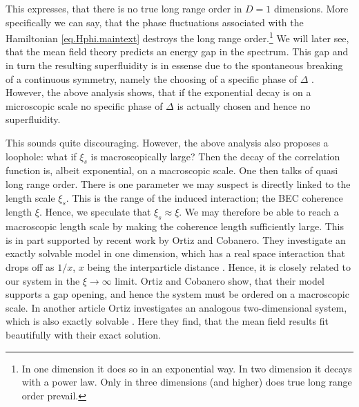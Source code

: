 This expresses, that there is no true long range order in $D = 1$ dimensions. More specifically we can say, that the phase fluctuations associated with the Hamiltonian \eqref{eq.Hphi.maintext} destroys the long range order.\footnote{In one dimension it does so in an exponential way. In two dimension it decays with a power law. Only in three dimensions (and higher) does true long range order prevail.} We will later see, that the mean field theory predicts an energy gap in the spectrum. This gap and in turn the resulting superfluidity is in essense due to the spontaneous breaking of a continuous symmetry, namely the choosing of a specific phase of $\Delta$ \cite[pp. 71-72]{BruusFlensberg}. However, the above analysis shows, that if the exponential decay is on a microscopic scale no specific phase of $\Delta$ is actually chosen and hence no superfluidity. 

This sounds quite discouraging. However, the above analysis also proposes a loophole: what if $\xi_s$ is macroscopically large? Then the decay of the correlation function is, albeit exponential, on a macroscopic scale. One then talks of quasi long range order. There is one parameter we may suspect is directly linked to the length scale $\xi_s$. This is the range of the induced interaction; the BEC coherence length $\xi$. Hence, we speculate that $\xi_s \approx \xi$. We may therefore be able to reach a macroscopic length scale by making the coherence length sufficiently large. This is in part supported by recent work by Ortiz and Cobanero. They investigate an exactly solvable model in one dimension, which has a real space interaction that drops off as $1 / x$, $x$ being the interparticle distance \cite{Ortiz.Beyondmeanfieldtheory}. Hence, it is closely related to our system in the $\xi \to \infty$ limit. Ortiz and Cobanero show, that their model supports a gap opening, and hence the system must be ordered on a macroscopic scale. In another article Ortiz investigates an analogous two-dimensional system, which is also exactly solvable \cite{Ortiz.pxpy}. Here they find, that the mean field results fit beautifully with their exact solution.

